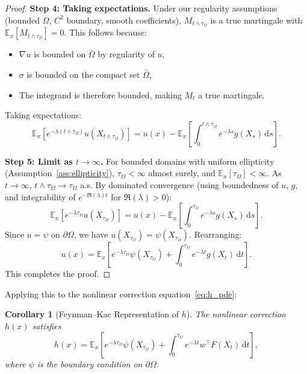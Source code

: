 \documentclass[11pt,a4paper]{article}
\newtheorem{corollary}[theorem]{Corollary}
\newcommand{\E}{\mathbb{E}}
\newcommand{\dt}{\,\mathrm{d}t}
\newcommand{\ds}{\,\mathrm{d}s}
\begin{document}
\begin{proof}
\textbf{Step 4: Taking expectations.}
Under our regularity assumptions (bounded $\Omega$, $C^2$ boundary, smooth coefficients), $M_{t \wedge \tau_\Omega}$ is a true martingale with $\E_x[M_{t \wedge \tau_\Omega}] = 0$. This follows because:
\begin{itemize}
\item $\nabla u$ is bounded on $\bar{\Omega}$ by regularity of $u$,
\item $\sigma$ is bounded on the compact set $\bar{\Omega}$,
\item The integrand is therefore bounded, making $M_t$ a true martingale.
\end{itemize}
Taking expectations:
\begin{equation}
\E_x\left[e^{-\lambda(t \wedge \tau_\Omega)} u(X_{t \wedge \tau_\Omega})\right] = u(x) - \E_x\left[\int_0^{t \wedge \tau_\Omega} e^{-\lambda s} g(X_s)\ds\right].
\end{equation}

\textbf{Step 5: Limit as $t \to \infty$.}
For bounded domains with uniform ellipticity (Assumption~\ref{ass:ellipticity}), $\tau_\Omega < \infty$ almost surely, and $\E_x[\tau_\Omega] < \infty$. As $t \to \infty$, $t \wedge \tau_\Omega \to \tau_\Omega$ a.s. By dominated convergence (using boundedness of $u$, $g$, and integrability of $e^{-\Re(\lambda) t}$ for $\Re(\lambda) > 0$):
\begin{equation}
\E_x\left[e^{-\lambda \tau_\Omega} u(X_{\tau_\Omega})\right] = u(x) - \E_x\left[\int_0^{\tau_\Omega} e^{-\lambda s} g(X_s)\ds\right].
\end{equation}
Since $u = \psi$ on $\partial\Omega$, we have $u(X_{\tau_\Omega}) = \psi(X_{\tau_\Omega})$. Rearranging:
\begin{equation}
u(x) = \E_x\left[e^{-\lambda \tau_\Omega} \psi(X_{\tau_\Omega}) + \int_0^{\tau_\Omega} e^{-\lambda t} g(X_t)\dt\right].
\end{equation}
This completes the proof.
\end{proof}

Applying this to the nonlinear correction equation~\eqref{eq:h_pde}:

\begin{corollary}[Feynman--Kac Representation of $h$]\label{cor:h_feynman_kac}
The nonlinear correction $h(x)$ satisfies
\begin{equation}\label{eq:h_FK}
h(x) = \E_x\left[e^{-\lambda \tau_\Omega} \psi(X_{\tau_\Omega}) + \int_0^{\tau_\Omega} e^{-\lambda t} w^\top F(X_t) \dt\right],
\end{equation}
where $\psi$ is the boundary condition on $\partial\Omega$.
\end{corollary}
\end{document}
